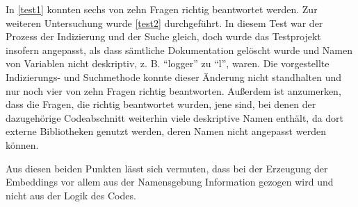\documentclass[../main.tex]{subfiles}
\begin{document}
In \ref{test1} konnten sechs von zehn Fragen richtig beantwortet werden.
Zur weiteren Untersuchung wurde \ref{test2} durchgeführt.
In diesem Test war der Prozess der Indizierung und der Suche gleich, doch wurde das Testprojekt insofern angepasst, als dass sämtliche Dokumentation gelöscht wurde und Namen von Variablen nicht deskriptiv, z. B. \enquote{logger} zu \enquote{l}, waren.
Die vorgestellte Indizierungs- und Suchmethode konnte dieser Änderung nicht standhalten und nur noch vier von zehn Fragen richtig beantworten.
Außerdem ist anzumerken, dass die Fragen, die richtig beantwortet wurden, jene sind, bei denen der dazugehörige Codeabschnitt weiterhin viele deskriptive Namen enthält, da dort externe Bibliotheken genutzt werden, deren Namen nicht angepasst werden können.


Aus diesen beiden Punkten lässt sich vermuten, dass bei der Erzeugung der Embeddings vor allem aus der Namensgebung Information gezogen wird und nicht aus der Logik des Codes.
\end{document}

